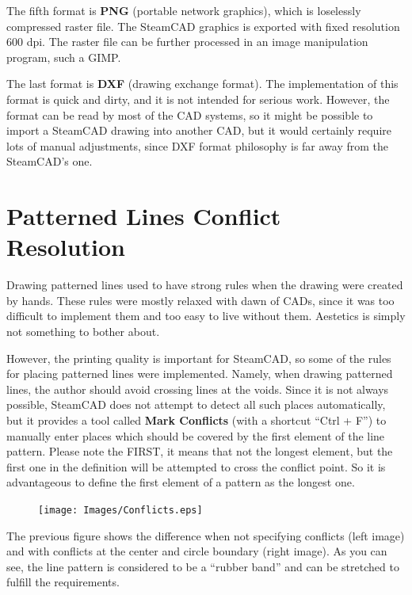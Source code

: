The fifth format is \textbf{PNG} (portable network graphics), which is loselessly
compressed raster file. The SteamCAD graphics is exported with fixed resolution
600 dpi. The raster file can be further processed in an image manipulation
program, such a GIMP.

The last format is \textbf{DXF} (drawing exchange format). The implementation
of this format is quick and dirty, and it is not intended for serious work. However,
the format can be read by most of the CAD systems, so it might be possible to
import a SteamCAD drawing into another CAD, but it would certainly require lots
of manual adjustments, since DXF format philosophy is far away from the SteamCAD's
one.

\section{Patterned Lines Conflict Resolution}

Drawing patterned lines used to have strong rules when the drawing were created
by hands. These rules were mostly relaxed with dawn of CADs, since it was too
difficult to implement them and too easy to live without them. Aestetics is simply
not something to bother about.

However, the printing quality is important for SteamCAD, so some of the rules
for placing patterned lines were implemented. Namely, when drawing patterned
lines, the author should avoid crossing lines at the voids. Since it is not always
possible, SteamCAD does not attempt to detect all such places automatically, but
it provides a tool called \textbf{Mark Conflicts} (with a shortcut ``Ctrl + F'')
to manually enter places which should be covered by the first element of the
line pattern. Please note the FIRST, it means that not the longest element, but the
first one in the definition will be attempted to cross the conflict point. So
it is advantageous to define the first element of a pattern as the longest one.

\begin{figure}[h]
\begin{center}
\texttt{[image: Images/Conflicts.eps]}
\end{center}
\end{figure}

The previous figure shows the difference when not specifying conflicts (left
image) and with conflicts at the center and circle boundary (right image).
As you can see, the line pattern is considered to be a ``rubber band'' and
can be stretched to fulfill the requirements.

